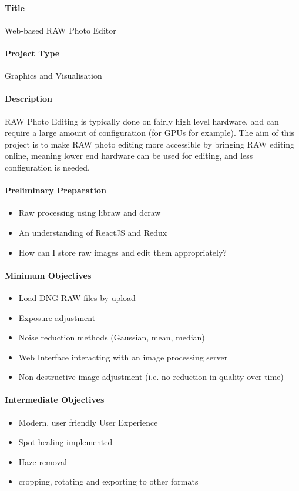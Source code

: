 \documentclass{article}
\begin{document}
    \paragraph{Title}
        Web-based RAW Photo Editor
    \paragraph{Project Type}
        Graphics and Visualisation
    \paragraph{Description}
        RAW Photo Editing is typically done on fairly high level hardware, and can
        require a large amount of configuration (for GPUs for example). The aim of
        this project is to make RAW photo editing more accessible by bringing RAW editing
        online, meaning lower end hardware can be used for editing, and less configuration
        is needed.
    \paragraph{Preliminary Preparation}
        \begin{itemize}
          \item Raw processing using libraw and dcraw
          \item An understanding of ReactJS and Redux
          \item How can I store raw images and edit them appropriately?
        \end{itemize}
    \paragraph{Minimum Objectives}
        \begin{itemize}
          \item Load DNG RAW files by upload
          \item Exposure adjustment
          \item Noise reduction methods (Gaussian, mean, median)
          \item Web Interface interacting with an image processing server
          \item Non-destructive image adjustment (i.e. no reduction in quality over time)
        \end{itemize}
    \paragraph{Intermediate Objectives}
        \begin{itemize}
          \item Modern, user friendly User Experience
          \item Spot healing implemented
          \item Haze removal
          \item cropping, rotating and exporting to other formats
        \end{itemize}
\end{document}
